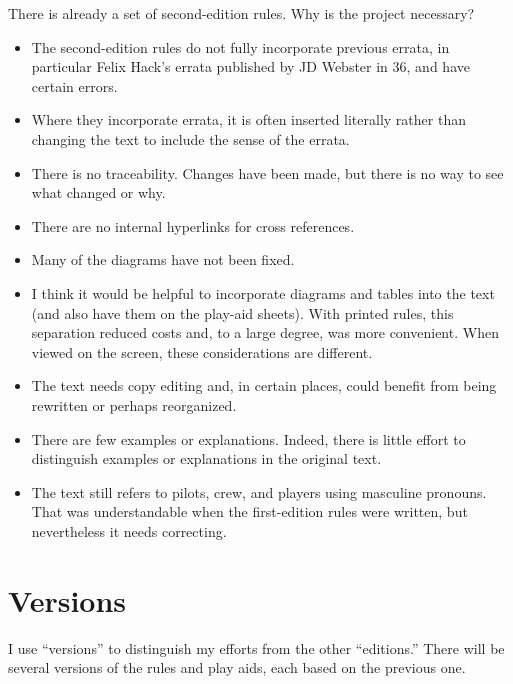 \documentclass[10pt]{article}
\begin{document}
There is already a set of second-edition rules. Why is the project necessary?
\begin{itemize}
    \item The second-edition rules do not fully incorporate previous errata, in particular Felix Hack’s errata published by JD Webster in {\APJ} 36, and have certain errors.
    \item Where they incorporate errata, it is often inserted literally rather than changing the text to include the sense of the errata.
    \item There is no traceability. Changes have been made, but there is no way to see what changed or why.
    \item There are no internal hyperlinks for cross references.
    \item Many of the diagrams have not been fixed.
    \item I think it would be helpful to incorporate diagrams and tables into the text (and also have them on the play-aid sheets). With printed rules, this separation reduced costs and, to a large degree, was more convenient. When viewed on the screen, these considerations are different.
    \item The text needs copy editing and, in certain places, could benefit from being rewritten or perhaps reorganized.
    \item There are few examples or explanations. Indeed, there is little effort to distinguish examples or explanations in the original text.
    \item The text still refers to pilots, crew, and players using masculine pronouns. That was understandable when the first-edition rules were written, but nevertheless it needs correcting.
\end{itemize}

\section{Versions}

I use “versions” to distinguish my efforts from the other “editions.” There will be several versions of the rules and play aids, each based on the previous one. 
\end{document}
